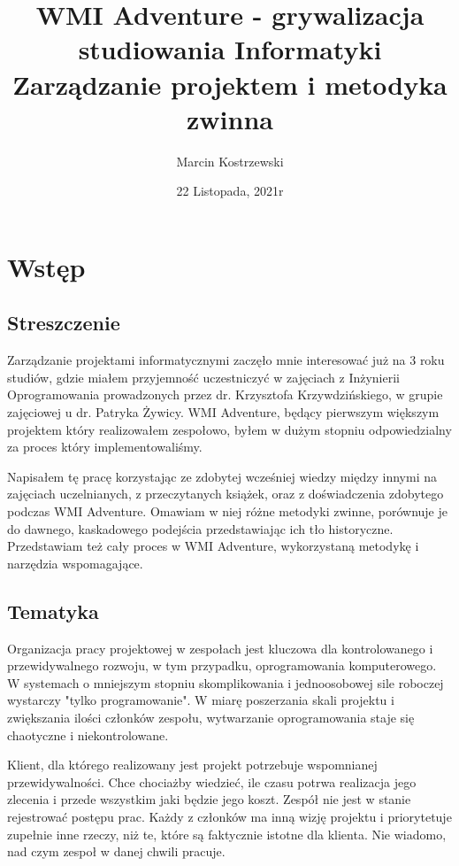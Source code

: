 \documentclass{article}
\title{
    WMI Adventure - grywalizacja studiowania Informatyki \\
    \large Zarządzanie projektem i metodyka zwinna
    }
\author{Marcin Kostrzewski}
\date{22 Listopada, 2021r}
\begin{document}
\maketitle
\newpage
\tableofcontents
\newpage


\section{Wstęp}

\subsection{Streszczenie}
Zarządzanie projektami informatycznymi zaczęło mnie interesować już na 3 roku studiów, gdzie miałem przyjemność uczestniczyć w zajęciach z Inżynierii Oprogramowania prowadzonych przez
dr. Krzysztofa Krzywdzińskiego, w grupie zajęciowej u dr. Patryka Żywicy. WMI Adventure, będący pierwszym większym projektem który realizowałem zespołowo, byłem w dużym stopniu odpowiedzialny za
proces który implementowaliśmy.

Napisałem tę pracę korzystając ze zdobytej wcześniej wiedzy między innymi na zajęciach uczelnianych, z przeczytanych książek,
oraz z doświadczenia zdobytego podczas WMI Adventure. Omawiam w niej różne metodyki zwinne, porównuje je do dawnego, kaskadowego podejścia przedstawiając ich tło historyczne. Przedstawiam też cały proces w WMI Adventure, wykorzystaną metodykę i narzędzia wspomagające.

\subsection{Tematyka}
Organizacja pracy projektowej w zespołach jest kluczowa dla kontrolowanego i przewidywalnego rozwoju, w tym przypadku, oprogramowania komputerowego. W systemach o mniejszym stopniu skomplikowania
i jednoosobowej sile roboczej wystarczy "tylko programowanie". W miarę poszerzania skali projektu i zwiększania ilości członków zespołu, wytwarzanie oprogramowania staje się chaotyczne i niekontrolowane.

Klient, dla którego realizowany jest projekt potrzebuje wspomnianej przewidywalności. Chce chociażby wiedzieć, ile czasu potrwa realizacja jego zlecenia i przede wszystkim jaki będzie jego koszt. Zespół nie jest w stanie
rejestrować postępu prac. Każdy z członków ma inną wizję projektu i priorytetuje zupełnie inne rzeczy, niż te, które są faktycznie istotne dla klienta. Nie wiadomo, nad czym zespoł w danej chwili pracuje.
\end{document}
